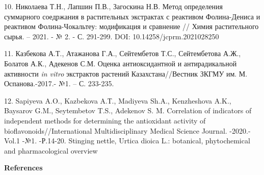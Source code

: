 \begin{references}
10. Николаева Т.Н., Лапшин П.В., Загоскина Н.В. Метод определения
суммарного соедржания в растительных экстрактах с реактивом
Фолина-Дениса и реактивом Фолина-Чокальтеу: модификация и сравнение //
Химия растительного сырья. -- 2021. - № 2. - С. 291-299. DOI:
10.14258/jcprm.2021028250

11. Казбекова А.Т., Атажанова Г.А., Сейтембетов Т.С., Сейтембетова А.Ж.,
Болатов А.К., Адекенов С.М. Оценка антиоксидантной и антирадикальной
активности \emph{in vitro} экстрактов растений Казахстана//Вестник
ЗКГМУ им. М. Оспанова.-2017.- №1. -- С. 233-235.

12. Sapiyeva A.O., Kazbekova A.Т., Madiyeva Sh.A., Kenzheshova A.K.,
Baysarov G.M., Seytembetov T.S., Adekenov S. M. Correlation of
indicators of independent methods for determining the antioxidant
activity of bioflavonoids//International Multidisciplinary Medical
Science Journal. -2020.-Vol.1 -№1. -Р.14-20.
Stinging nettle, Urtica dioica L.: botanical, phytochemical
and pharmacological overview
\end{references}

\begin{center}
{\bfseries References}
\end{center}


